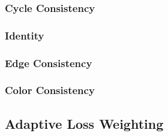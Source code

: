 \documentclass[twoside,english,notitlepage]{report}
\begin{document}
\subsubsection{Cycle Consistency}

\subsubsection{Identity}

\subsubsection{Edge Consistency}

\subsubsection{Color Consistency}

\subsection{Adaptive Loss Weighting}








\end{document}
